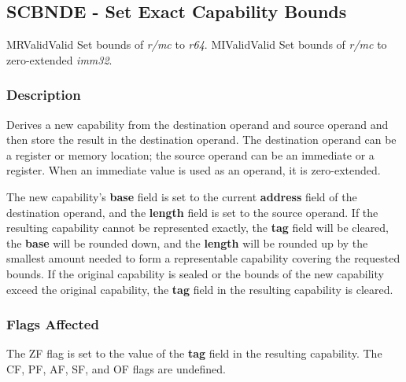 \clearpage
{}
{}
\subsection*{SCBNDE - Set Exact Capability Bounds}

\begin{x86opcodetable}
  {MR}{Valid}{Valid}
  {Set bounds of \emph{r/mc} to \emph{r64}.}
  {MI}{Valid}{Valid}
  {Set bounds of \emph{r/mc} to zero-extended \emph{imm32}.}
\end{x86opcodetable}

\begin{x86opentable}
\end{x86opentable}

\subsubsection*{Description}

Derives a new capability from the destination operand and source
operand and then store the result in the destination operand.  The
destination operand can be a register or memory location; the source
operand can be an immediate or a register.  When an immediate value is
used as an operand, it is zero-extended.

The new capability's \textbf{base} field is set to the current
\textbf{address} field of the destination operand, and the
\textbf{length} field is set to the source operand.  If the resulting
capability cannot be represented exactly, the \textbf{tag} field will
be cleared, the \textbf{base} will be rounded down, and the
\textbf{length} will be rounded up by the smallest amount needed to
form a representable capability covering the requested bounds.  If the
original capability is sealed or the bounds of the new capability
exceed the original capability, the \textbf{tag} field in the
resulting capability is cleared.

\subsubsection*{Flags Affected}

The ZF flag is set to the value of the \textbf{tag} field in the
resulting capability.  The CF, PF, AF, SF, and OF flags are undefined.
